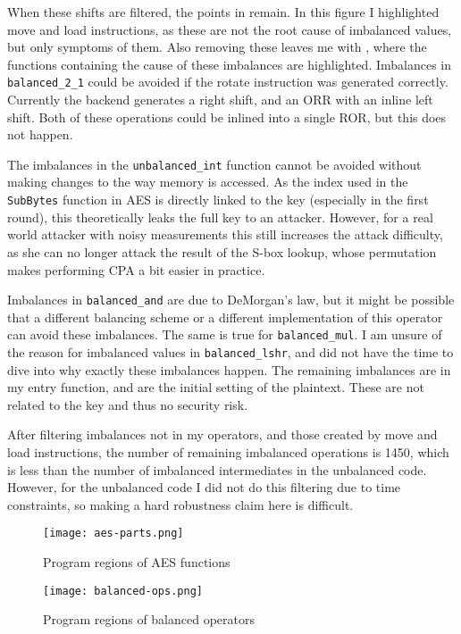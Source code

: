 When these shifts are filtered, the points in  remain.
In this figure I highlighted move and load instructions, as these are not the root cause of imbalanced values, but only symptoms of them.
Also removing these leaves me with , where the functions containing the cause of these imbalances are highlighted.
Imbalances in \texttt{balanced\_2\_1} could be avoided if the rotate instruction was generated correctly.
Currently the backend generates a right shift, and an ORR with an inline left shift.
Both of these operations could be inlined into a single ROR, but this does not happen.

The imbalances in the \texttt{unbalanced\_int} function cannot be avoided without making changes to the way memory is accessed.
As the index used in the \texttt{SubBytes} function in AES is directly linked to the key (especially in the first round), this theoretically leaks the full key to an attacker.
However, for a real world attacker with noisy measurements this still increases the attack difficulty, as she can no longer attack the result of the S-box lookup, whose permutation makes performing CPA a bit easier in practice.

Imbalances in \texttt{balanced\_and} are due to DeMorgan's law, but it might be possible that a different balancing scheme or a different implementation of this operator can avoid these imbalances.
The same is true for \texttt{balanced\_mul}.
I am unsure of the reason for imbalanced values in \texttt{balanced\_lshr}, and did not have the time to dive into why exactly these imbalances happen.
The remaining imbalances are in my entry function, and are the initial setting of the plaintext.
These are not related to the key and thus no security risk.

After filtering imbalances not in my operators, and those created by move and load instructions, the number of remaining imbalanced operations is 1450, which is less than the number of imbalanced intermediates in the unbalanced code.
However, for the unbalanced code I did not do this filtering due to time constraints, so making a hard robustness claim here is difficult.

\begin{sidewaysfigure}[ht]
  \centering
  \texttt{[image: aes-parts.png]}
  \caption{Program regions of AES functions}
  \label{fig:aes}
\end{sidewaysfigure}

\begin{sidewaysfigure}[h]
  \centering
  \texttt{[image: balanced-ops.png]}
  \caption{Program regions of balanced operators}
  \label{fig:ops}
\end{sidewaysfigure}

